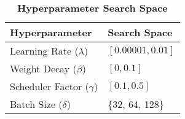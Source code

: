 \begin{table}[!ht]
    \centering
    \caption{\textbf{Hyperparameter Search Space}}
    \label{tab:hyperparameters}
    \begin{tabular}{ll}
    \toprule
    \textbf{Hyperparameter} & \textbf{Search Space} \\
    \midrule
    Learning Rate (\( \lambda \)) & $[0.00001, 0.01]$ \\
    Weight Decay (\( \beta \)) & $[0, 0.1]$ \\
    Scheduler Factor (\(\gamma\)) & $[0.1, 0.5]$ \\
    Batch Size (\(\delta\)) & \{32, 64, 128\} \\
    \bottomrule
    \end{tabular}
\end{table}
